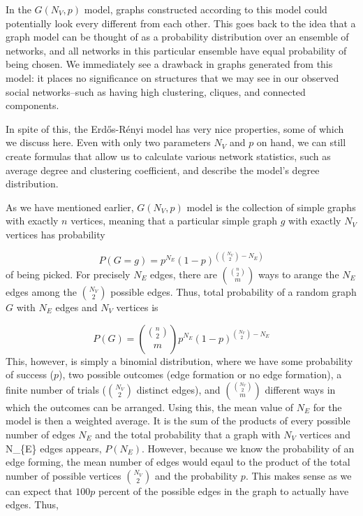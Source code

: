 \documentclass[12pt,twoside]{amherstthesis}
\begin{document}
  In the \(G(N_V, p)\) model, graphs constructed according to this model
  could potentially look every different from each other. This goes back
  to the idea that a graph model can be thought of as a probability
  distribution over an ensemble of networks, and all networks in this
  particular ensemble have equal probability of being chosen. We
  immediately see a drawback in graphs generated from this model: it
  places no significance on structures that we may see in our observed
  social networks--such as having high clustering, cliques, and connected
  components.
  
  In spite of this, the Erdős-Rényi model has very nice properties, some
  of which we discuss here. Even with only two parameters \(N_{V}\) and
  \(p\) on hand, we can still create formulas that allow us to calculate
  various network statistics, such as average degree and clustering
  coefficient, and describe the model's degree distribution.
  
  As we have mentioned earlier, \(G(N_V, p)\) model is the collection of
  simple graphs with exactly \(n\) vertices, meaning that a particular
  simple graph \(g\) with exactly \(N_V\) vertices has probability
  
  \[P(G = g) = p^{N_E}(1 - p)^{\left({N_V \choose 2} - N_E \right)}\] of
  being picked. For precisely \(N_E\) edges, there are
  \({{n \choose 2} \choose m}\) ways to arange the \(N_{E}\) edges among
  the \({N_V \choose 2}\) possible edges. Thus, total probability of a
  random graph \(G\) with \(N_{E}\) edges and \(N_{V}\) vertices is
  
  \[P(G) = {{n \choose 2} \choose m}p^{N_E}(1 - p)^{{N_V \choose 2} - N_E}\]
  This, however, is simply a binomial distribution, where we have some
  probability of success (\(p\)), two possible outcomes (edge formation or
  no edge formation), a finite number of trials (\({N_{V} \choose 2}\)
  distinct edges), and \({{N_{V} \choose 2} \choose m}\) different ways in
  which the outcomes can be arranged. Using this, the mean value of
  \(N_E\) for the model is then a weighted average. It is the sum of the
  products of every possible number of edges \(N_E\) and the total
  probability that a graph with \(N_{V}\) vertices and N\_\{E\} edges
  appears, \(P(N_{E})\). However, because we know the probability of an
  edge forming, the mean number of edges would eqaul to the product of the
  total number of possible vertices \({N_{V} \choose 2}\) and the
  probability \(p\). This makes sense as we can expect that \(100p\)
  percent of the possible edges in the graph to actually have edges. Thus,
  
\end{document}
